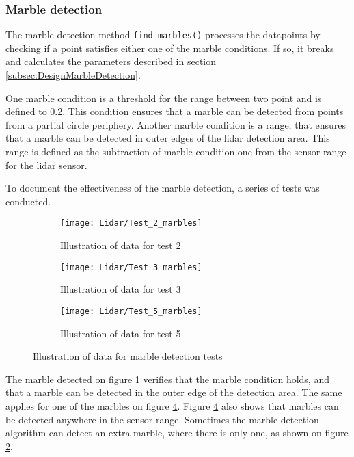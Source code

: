 \documentclass[../Head/Main.tex]{subfiles}
\begin{document}
\subsubsection{Marble detection}
\label{subsubsec:Implementation_marble}
The marble detection method \texttt{find\_marbles()} processes the datapoints by checking if a point satisfies either one of the marble conditions. If so, it breaks and calculates the parameters described in section \ref{subsec:DesignMarbleDetection}.\par 
One marble condition is a threshold for the range between two point and is defined to 0.2. This condition ensures that a marble can be detected from points from a partial circle periphery. Another marble condition is a range, that ensures that a marble can be detected in outer edges of the lidar detection area. This range is defined as the subtraction of marble condition one from the sensor range for the lidar sensor.\par
To document the effectiveness of the marble detection, a series of tests was conducted.
\begin{figure}[H]
  \begin{subfigure}[b]{0.3\textwidth}
  	\centering
    \texttt{[image: Lidar/Test\_2\_marbles]}
    \caption{Illustration of data for test 2}
    \label{fig:MarbleTest2}
  \end{subfigure}
  \hfill
  \begin{subfigure}[b]{0.3\textwidth}
  	\centering
    \texttt{[image: Lidar/Test\_3\_marbles]}
    \caption{Illustration of data for test 3}
    \label{fig:MarbleTest3}
  \end{subfigure}
  \hfill
  \begin{subfigure}[b]{0.3\textwidth}
    \centering
    \texttt{[image: Lidar/Test\_5\_marbles]}
    \caption{Illustration of data for test 5}
    \label{fig:MarbleTest5}
  \end{subfigure}
  \caption{Illustration of data for marble detection tests}
\end{figure}
The marble detected on figure \ref{fig:MarbleTest2} verifies that the marble condition holds, and that a marble can be detected in the outer edge of the detection area. The same applies for one of the marbles on figure \ref{fig:MarbleTest5}. Figure \ref{fig:MarbleTest5} also shows that marbles can be detected anywhere in the sensor range. Sometimes the marble detection algorithm can detect an extra marble, where there is only one, as shown on figure \ref{fig:MarbleTest3}. 
\end{document}
